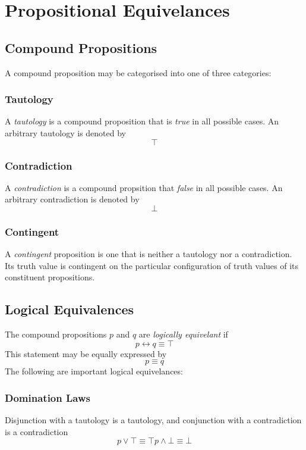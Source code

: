 \documentclass[twocolumn]{report}
\begin{document}
\section{Propositional Equivelances}
\subsection{Compound Propositions}
A compound proposition may be categorised into one of three categories:
\subsubsection{Tautology}
A \textit{tautology} is a compound proposition that is \textit{true} in all possible cases. 
An arbitrary tautology is denoted by 
\[
	\top
\]
\subsubsection{Contradiction}
A \textit{contradiction} is a compound propsition that \textit{false} in all possible cases.
An arbitrary contradiction is denoted by
\[
	\bot
\]
\subsubsection{Contingent}
A \textit{contingent} proposition is one that is neither a tautology nor a contradiction. 
Its truth value is contingent on the particular configuration of truth values of its constituent propositions.

\subsection{Logical Equivalences}
The compound propositions $p$ and $q$ are \textit{logically equivelant} if 
\begin{equation}
	p \leftrightarrow q \equiv \top
	\label{eqn: logical-equivelance}
\end{equation}
This statement may be equally expressed by 
\[
	p \equiv q
\]
The following are important logical equivelances:
\subsubsection{Domination Laws}
Disjunction with a tautology is a tautology, and conjunction with a contradiction is a contradiction
\begin{subequations}
	\begin{equation}
		p \lor \top \equiv \top
		\label{eqn: disjunction-domination-law}
	\end{equation}
	\begin{equation}
		p \wedge \bot \equiv \bot
		\label{eqn: conjunction-domination-law}
	\end{equation}
\end{subequations}
\end{document}
